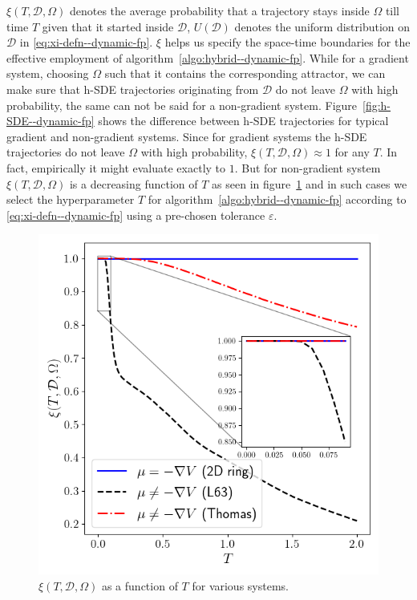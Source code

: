 $\xi(T, \mathcal D, \Omega)$ denotes the average probability that a trajectory stays inside $\Omega$ till time $T$ given that it started inside $\mathcal D$, $U(\mathcal D)$ denotes the uniform distribution on $\mathcal D$ in \eqref{eq:xi-defn--dynamic-fp}. $\xi$ helps us specify the space-time boundaries for the effective employment of algorithm~\ref{algo:hybrid--dynamic-fp}. While for a gradient system, choosing $\Omega$ such that it contains the corresponding attractor, we can make sure that h-SDE trajectories originating from $\mathcal D$ do not leave $\Omega$ with high probability, the same can not be said for a non-gradient system. Figure~\ref{fig:h-SDE--dynamic-fp} shows the difference between h-SDE trajectories for typical gradient and non-gradient systems. Since for gradient systems the h-SDE trajectories do not leave $\Omega$ with high probability, $\xi(T, \mathcal D, \Omega)\approx 1$ for any $T$. In fact, empirically it might evaluate exactly to $1$. But for non-gradient system $\xi(T, \mathcal D, \Omega)$ is a decreasing function of $T$ as seen in figure~\ref{fig:xi--dynamic-fp} and in such cases we select the hyperparameter $T$ for algorithm~\ref{algo:hybrid--dynamic-fp} according to \eqref{eq:xi-defn--dynamic-fp} using a pre-chosen tolerance $\varepsilon$.

\begin{figure}[!ht]
    \centering
\includegraphics[scale=0.5]{dynamic-fp/plots/dynamic-plots-xi.png}
    \caption{$\xi(T, \mathcal D, \Omega)$ as a function of $T$ for various systems.}
    \label{fig:xi--dynamic-fp}
\end{figure}


